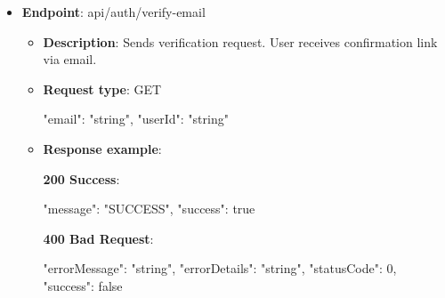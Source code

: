 \begin{itemize}
\begin{itemize}
        \begin{spverbatim}
        {
            "errorMessage": "string",
            "errorDetails": "string",
            "statusCode": 0,
            "success": true
        }
        \end{spverbatim}
        \item \textbf{Response messages}:
        \begin{enumerate}
            \item Success.
            \item User already registered.
            \item Weak password.
            \item Invalid email.
            \item Invalid verification method.
            \item Invalid display name.
            \item Phone occupied.
        \end{enumerate}
    \end{itemize}

    \item \textbf{Endpoint}: api/auth/verify-email

    \begin{itemize}
        \item \textbf{Description}: Sends verification request.
        User receives confirmation link via email.
        \item \textbf{Request type}: GET
        \begin{spverbatim}
        {
            "email": "string",
            "userId": "string"
        }
        \end{spverbatim}
        \item  \textbf{Response example}:

        \textbf{200 Success}:

        \begin{spverbatim}
        {
            "message": "SUCCESS",
            "success": true
        }
        \end{spverbatim}

        \textbf{400 Bad Request}:

        \begin{spverbatim}
        {
            "errorMessage": "string",
            "errorDetails": "string",
            "statusCode": 0,
            "success": false
        }
        \end{spverbatim}


\end{itemize}
\end{itemize}
